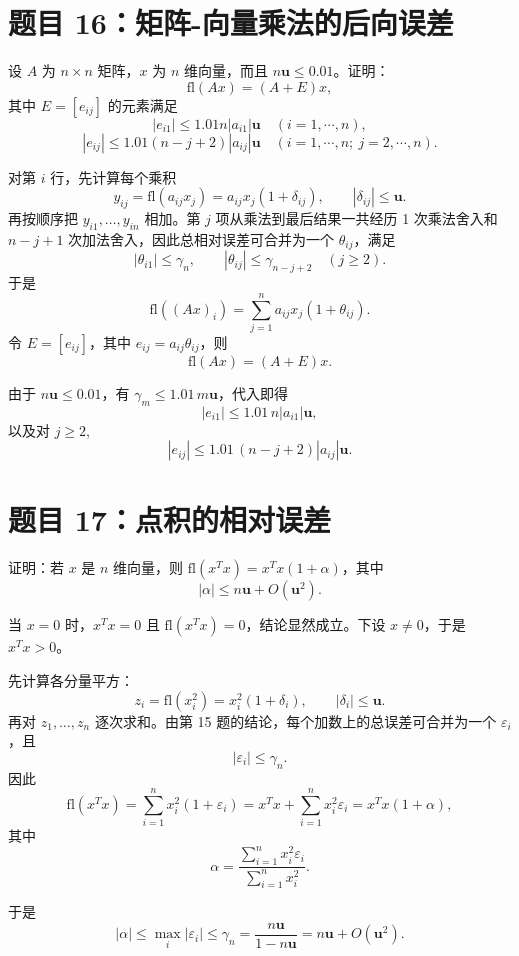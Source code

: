 \documentclass{article}
\newcommand{\fl}{\mathrm{fl}}
\begin{document}
\section{题目 16：矩阵-向量乘法的后向误差}

设 $A$ 为 $n \times n$ 矩阵，$x$ 为 $n$ 维向量，而且 $n\mathbf{u} \le 0.01$。证明：
\[
  \fl(Ax) = (A+E)x,
\]
其中 $E = [e_{ij}]$ 的元素满足
\[
  |e_{i1}| \le 1.01n|a_{i1}|\mathbf{u} \quad (i = 1, \cdots, n),
\]
\[
  |e_{ij}| \le 1.01(n-j+2)|a_{ij}|\mathbf{u} \quad (i = 1, \cdots,
  n;\ j = 2, \cdots, n).
\]

\begin{solution}

  对第 $i$ 行，先计算每个乘积
  \[
    y_{ij}=\fl(a_{ij}x_j)=a_{ij}x_j(1+\delta_{ij}),\qquad
    |\delta_{ij}|\le \mathbf{u}.
  \]
  再按顺序把 $y_{i1},\ldots,y_{in}$ 相加。第 $j$ 项从乘法到最后结果一共经历 1 次乘法舍入和
  $n-j+1$ 次加法舍入，因此总相对误差可合并为一个 $\theta_{ij}$，满足
  \[
    |\theta_{i1}|\le \gamma_n,\qquad |\theta_{ij}|\le
    \gamma_{n-j+2}\quad (j\ge 2).
  \]
  于是
  \[
    \fl((Ax)_i)=\sum_{j=1}^n a_{ij}x_j(1+\theta_{ij}).
  \]
  令 $E=[e_{ij}]$，其中 $e_{ij}=a_{ij}\theta_{ij}$，则
  \[
    \fl(Ax)=(A+E)x.
  \]

  由于 $n\mathbf{u}\le 0.01$，有 $\gamma_m\le 1.01\,m\mathbf{u}$，代入即得
  \[
    |e_{i1}|\le 1.01\,n|a_{i1}|\mathbf{u},
  \]
  以及对 $j\ge 2$,
  \[
    |e_{ij}|\le 1.01\,(n-j+2)|a_{ij}|\mathbf{u}.
  \]

\end{solution}

\section{题目 17：点积的相对误差}

证明：若 $x$ 是 $n$ 维向量，则 $\fl(x^T x) = x^T x(1+\alpha)$，其中
\[
  |\alpha| \le n\mathbf{u} + O(\mathbf{u}^2).
\]

\begin{solution}

  当 $x=0$ 时，$x^Tx=0$ 且 $\fl(x^Tx)=0$，结论显然成立。下设 $x\neq 0$，于是 $x^Tx>0$。

  先计算各分量平方：
  \[
    z_i=\fl(x_i^2)=x_i^2(1+\delta_i),\qquad |\delta_i|\le \mathbf{u}.
  \]
  再对 $z_1,\ldots,z_n$ 逐次求和。由第 15 题的结论，每个加数上的总误差可合并为一个 $\varepsilon_i$，且
  \[
    |\varepsilon_i|\le \gamma_n.
  \]
  因此
  \[
    \fl(x^Tx)=\sum_{i=1}^n x_i^2(1+\varepsilon_i)
    =x^Tx+\sum_{i=1}^n x_i^2\varepsilon_i
    =x^Tx(1+\alpha),
  \]
  其中
  \[
    \alpha=\frac{\sum_{i=1}^n x_i^2\varepsilon_i}{\sum_{i=1}^n x_i^2}.
  \]

  于是
  \[
    |\alpha|\le \max_i|\varepsilon_i|\le \gamma_n
    =\frac{n\mathbf{u}}{1-n\mathbf{u}}
    =n\mathbf{u}+O(\mathbf{u}^2).
  \]

\end{solution}
\end{document}
